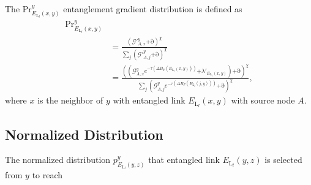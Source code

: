 \documentclass[11pt]{article}%
\begin{document}
The $\mathrm{P}{\mathrm{r}}^y_{E_{{\mathrm{L}}_l}\left(x,y\right)}$ entanglement gradient distribution is defined as
\begin{equation} \label{ZEqnNum775885} 
\begin{split}
\mathrm{P}{\mathrm{r}}^y_{E_{{\mathrm{L}}_l}\left(x,y\right)}\\&\mathrm{=}\frac{{\left({\mathcal{G}}'^y_{A,x}\mathrm{+}\mathrm{\partial }\right)}^{\chi }}{\sum_j{{\left({\mathcal{G}}'^y_{A,j}\mathrm{+}\mathrm{\partial }\right)}^{\chi }}}\\&\mathrm{=}\frac{{\left(\left({\mathcal{G}}^y_{A,x}e^{\mathrm{-}\tau \left(\mathit{\Delta}B_F\left(E_{{\mathrm{L}}_l}\left(x,y\right)\right)\right)}\mathrm{+}{\lambda }'_{E_{{\mathrm{L}}_l}\left(x,y\right)}\right)\mathrm{+}\mathrm{\partial }\right)}^{\chi }}{\sum_j{{\left({\mathcal{G}}^y_{A,j}e^{\mathrm{-}\tau \left(\mathit{\Delta}B_F\left(E_{{\mathrm{L}}_l}\left(j,y\right)\right)\right)}\mathrm{+}\mathrm{\partial }\right)}^{\chi }}},                 
\end{split}
\end{equation} 
where $x$ is the neighbor of $y$ with entangled link $E_{{\mathrm{L}}_l}\left(x,y\right)$ with source node $A$.


\newpage
\subsection{Normalized Distribution}

The normalized distribution $p^y_{E_{{\mathrm{L}}_l}\left(y,z\right)}$ that entangled link $E_{{\mathrm{L}}_l}\left(y,z\right)$ is selected from $y$ to reach 
\end{document}
